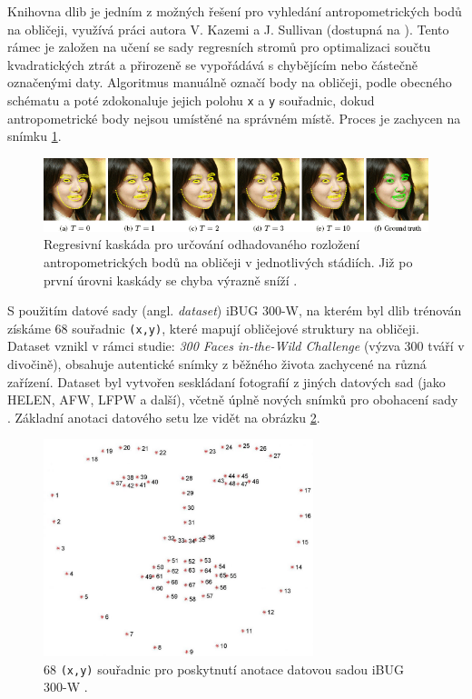 \noindent Knihovna dlib \cite{Kazemi2014OneMF}\cite{pyLandmarks} je jedním z možných řešení pro vyhledání antropometrických bodů na obličeji, využívá práci autora V. Kazemi a J. Sullivan (dostupná na \cite{Kazemi2014OneMF}). Tento rámec je založen na učení se sady regresních stromů pro optimalizaci součtu kvadratických ztrát a přirozeně se vypořádává s chybějícím nebo částečně označenými daty. Algoritmus manuálně označí body na obličeji, podle obecného schématu a poté zdokonaluje jejich polohu \texttt{x} a \texttt{y} souřadnic, dokud antropometrické body nejsou umístěné na správném místě. Proces je zachycen na snímku \ref{fig:casc-reg}. 

\begin{figure}[H]
	\centering
	\includegraphics[width=1\textwidth]{obrazky-figures/facial-landmark-regr.png}
	\caption{Regresivní kaskáda pro určování odhadovaného rozložení antropometrických bodů na obličeji v jednotlivých stádiích. Již po první úrovni kaskády se chyba výrazně sníží \cite{Kazemi2014OneMF}.}
        \label{fig:casc-reg}
\end{figure}

S použitím datové sady (angl. \textit{dataset}) iBUG 300-W, na kterém byl dlib trénován získáme 68 souřadnic \texttt{(x,y)}, které mapují obličejové struktury na obličeji. Dataset vznikl v rámci studie: \textit{300 Faces in-the-Wild Challenge} (výzva 300 tváří v divočině), obsahuje autentické snímky z běžného života zachycené na různá zařízení. Dataset byl vytvořen seskládaní fotografií z jiných datových sad (jako HELEN, AFW, LFPW a další), včetně úplně nových snímků pro obohacení sady \cite{SAGONAS20163}. Základní anotaci datového setu lze vidět na obrázku \ref{fig:i300-annotation}.

\begin{figure}[H]
	\centering
	\includegraphics[width=0.7\textwidth]{obrazky-figures/i300-landmarks.jpeg}
	\caption{68 \texttt{(x,y)} souřadnic pro poskytnutí anotace datovou sadou iBUG 300-W \cite{SAGONAS20163}.}
        \label{fig:i300-annotation}
\end{figure}


